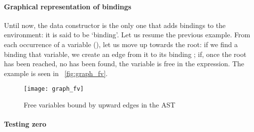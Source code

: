 \paragraph{Graphical representation of bindings}

Until now, the data constructor  is the only one that adds
bindings to the environment: it is said to be `binding'. Let us resume
the previous example. From each occurrence of a variable (),
let us move up towards the root: if we find a  binding that
variable, we create an edge from it to its binding ; if, once
the root has been reached, no  has been found, the variable
is free in the expression. The example is seen in
\fig~\vref{fig:graph_fv}.
\begin{figure}
\centering
\texttt{[image: graph\_fv]}
\caption{Free variables bound by upward edges in the AST
\label{fig:graph_fv}}
\end{figure}

\paragraph{Testing zero}

